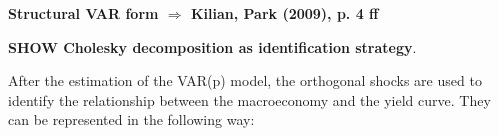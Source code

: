 
\textbf{Structural VAR form $\Rightarrow$ Kilian, Park (2009), p. 4 ff}

\textbf{SHOW Cholesky decomposition as identification strategy}. 

After the estimation of the VAR(p) model, the orthogonal shocks are used to identify the relationship between the macroeconomy and the yield curve. They can be represented in the following way:


